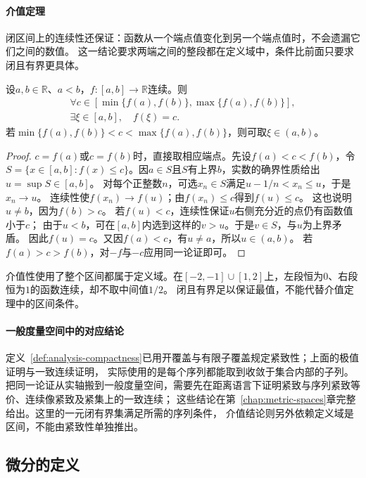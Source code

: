 \paragraph{介值定理}
闭区间上的连续性还保证：函数从一个端点值变化到另一个端点值时，不会遗漏它们之间的数值。
这一结论要求两端之间的整段都在定义域中，条件比前面只要求闭且有界更具体。
\begin{theorem}[介值定理]
\label{thm:analysis-intermediate-value}
设$a,b\in\mathbb R$、$a<b$，$f:[a,b]\to\mathbb R$连续。则
\[
 \begin{gathered}
 \forall c\in[\min\{f(a),f(b)\},\max\{f(a),f(b)\}],\\
 \exists\xi\in[a,b],\quad f(\xi)=c.
 \end{gathered}
\]
若$\min\{f(a),f(b)\}<c<\max\{f(a),f(b)\}$，则可取$\xi\in(a,b)$。
\end{theorem}
\begin{proof}
$c=f(a)$或$c=f(b)$时，直接取相应端点。先设$f(a)<c<f(b)$，令
$S=\{x\in[a,b]:f(x)\leq c\}$。因$a\in S$且$S$有上界$b$，实数的确界性质给出$u=\sup S\in[a,b]$。
对每个正整数$n$，可选$x_n\in S$满足$u-1/n<x_n\leq u$，于是$x_n\to u$。
连续性使$f(x_n)\to f(u)$；由$f(x_n)\leq c$得到$f(u)\leq c$。
这也说明$u\neq b$，因为$f(b)>c$。
若$f(u)<c$，连续性保证$u$右侧充分近的点仍有函数值小于$c$；
由于$u<b$，可在$[a,b]$内选到这样的$v>u$。于是$v\in S$，与$u$为上界矛盾。
因此$f(u)=c$。又因$f(a)<c$，有$u\neq a$，所以$u\in(a,b)$。
若$f(a)>c>f(b)$，对$-f$与$-c$应用同一论证即可。
\end{proof}
介值性使用了整个区间都属于定义域。在$[-2,-1]\cup[1,2]$上，左段恒为$0$、右段恒为$1$的函数连续，却不取中间值$1/2$。
闭且有界足以保证最值，不能代替介值定理中的区间条件。

\paragraph{一般度量空间中的对应结论}
定义~\ref{def:analysis-compactness}已用开覆盖与有限子覆盖规定紧致性；上面的极值证明与一致连续证明，
实际使用的是每个序列都能取到收敛于集合内部的子列。
把同一论证从实轴搬到一般度量空间，需要先在距离语言下证明紧致与序列紧致等价、连续像紧致及紧集上的一致连续；
这些结论在第~\ref{chap:metric-spaces}章完整给出。这里的一元闭有界集满足所需的序列条件，
介值结论则另外依赖定义域是区间，不能由紧致性单独推出。

\par{}
\subsection{微分的定义}
\label{sec:analysis-derivatives-linear-approximation}

